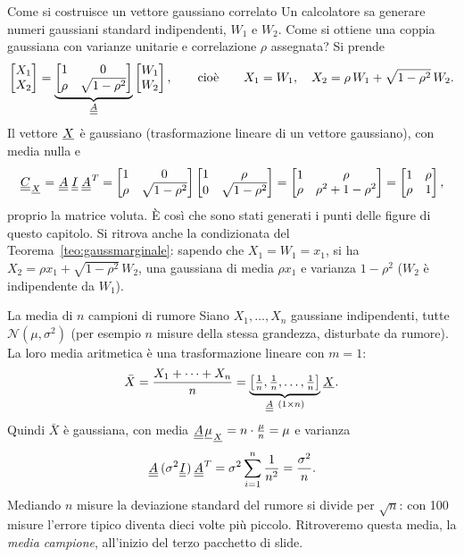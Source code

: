 \begin{esempio}{Come si costruisce un vettore gaussiano correlato}
Un calcolatore sa generare numeri gaussiani standard indipendenti, $W_1$ e $W_2$. Come si ottiene una coppia gaussiana
con varianze unitarie e correlazione $\rho$ assegnata? Si prende
\[ \begin{bmatrix} X_1 \\ X_2 \end{bmatrix} = \underbrace{\begin{bmatrix} 1 & 0 \\ \rho & \sqrt{1 - \rho^2}
   \end{bmatrix}}_{{\mkern1mu\underline{\underline{A}}\mkern1mu}} \begin{bmatrix} W_1 \\ W_2 \end{bmatrix} , \qquad\text{cioè}\qquad X_1 = W_1 , \quad X_2 =
   \rho\, W_1 + \sqrt{1 - \rho^2}\, W_2 . \]
Il vettore ${\mkern1mu\underline{X}\mkern1mu}$ è gaussiano (trasformazione lineare di un vettore gaussiano), con media nulla e
\[ {\mkern1mu\underline{\underline{C}}\mkern1mu}_{{\mkern1mu\underline{X}\mkern1mu}} = {\mkern1mu\underline{\underline{A}}\mkern1mu}\, {\mkern1mu\underline{\underline{I}}\mkern1mu}\, {\mkern1mu\underline{\underline{A}}\mkern1mu}^T = \begin{bmatrix} 1 & 0 \\ \rho & \sqrt{1 - \rho^2}
   \end{bmatrix} \begin{bmatrix} 1 & \rho \\ 0 & \sqrt{1 - \rho^2} \end{bmatrix} = \begin{bmatrix} 1 & \rho \\ \rho &
   \rho^2 + 1 - \rho^2 \end{bmatrix} = \begin{bmatrix} 1 & \rho \\ \rho & 1 \end{bmatrix} , \]
proprio la matrice voluta. È così che sono stati generati i punti delle figure di questo capitolo. Si ritrova anche la
condizionata del Teorema~\ref{teo:gaussmarginale}: sapendo che $X_1 = W_1 = x_1$, si ha $X_2 = \rho x_1 + \sqrt{1 -
\rho^2}\, W_2$, una gaussiana di media $\rho x_1$ e varianza $1 - \rho^2$ ($W_2$ è indipendente da $W_1$).
\end{esempio}

\begin{esempio}{La media di $n$ campioni di rumore}
Siano $X_1, \ldots, X_n$ gaussiane indipendenti, tutte $\mathcal{N}(\mu, \sigma^2)$ (per esempio $n$ misure della stessa
grandezza, disturbate da rumore). La loro media aritmetica è una trasformazione lineare con $m = 1$:
\[ \bar{X} = \frac{X_1 + \cdots + X_n}{n} = \underbrace{\left[ \tfrac1n, \tfrac1n, \ldots, \tfrac1n
   \right]}_{{\mkern1mu\underline{\underline{A}}\mkern1mu}\ (1 \times n)} {\mkern1mu\underline{X}\mkern1mu} . \]
Quindi $\bar{X}$ è gaussiana, con media ${\mkern1mu\underline{\underline{A}}\mkern1mu}{\mkern1mu\underline{\mu}\mkern1mu}_{{\mkern1mu\underline{X}\mkern1mu}} = n \cdot \frac{\mu}{n} = \mu$ e varianza
\[ {\mkern1mu\underline{\underline{A}}\mkern1mu}\, (\sigma^2 {\mkern1mu\underline{\underline{I}}\mkern1mu})\, {\mkern1mu\underline{\underline{A}}\mkern1mu}^T = \sigma^2 \sum_{i=1}^{n} \frac{1}{n^2} = \frac{\sigma^2}{n} . \]
Mediando $n$ misure la deviazione standard del rumore si divide per $\sqrt{n}$: con 100 misure l'errore tipico diventa
dieci volte più piccolo. Ritroveremo questa media, la \emph{media campione}, all'inizio del terzo pacchetto di slide.
\end{esempio}

